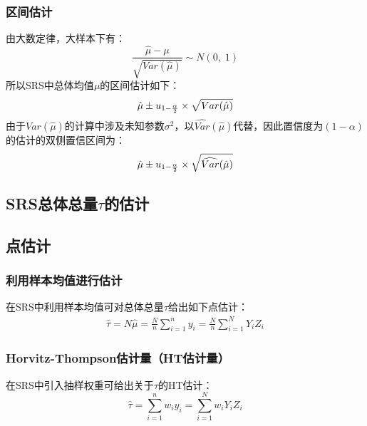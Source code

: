 \subsubsection{区间估计}
\begin{theorem}
	由大数定律，大样本下有：
	\begin{equation*}
		\frac{\hat{\mu}-\mu}{\sqrt{Var(\hat{\mu})}}\sim N(0,\;1)
	\end{equation*}
	所以SRS中总体均值$\mu$的区间估计如下：
	\begin{equation}
		\hat{\mu}\pm u_{1-\frac{\alpha}{2}}\times\sqrt{Var(\hat{\mu})}\notag
	\end{equation}
	由于$Var(\hat{\mu})$的计算中涉及未知参数$\sigma^2$，以$\widehat{Var}(\hat{\mu})$代替，因此置信度为$(1-\alpha)$的估计的双侧置信区间为\label{sec:SRSmuci}：
	\begin{equation}
		\hat{\mu}\pm u_{1-\frac{\alpha}{2}}\times\sqrt{\widehat{Var}(\hat{\mu})}\notag
	\end{equation}
\end{theorem}

\subsection{SRS总体总量$\tau$的估计}
\subsection*{点估计}
\subsubsection{利用样本均值进行估计}
\begin{definition}
	在SRS中利用样本均值可对总体总量$\tau$给出如下点估计：
	\begin{gather*}
		\hat{\tau}=N\hat{\mu}=\frac{N}{n}\sum\limits_{i=1}^{n}y_i=\frac{N}{n}\sum\limits_{i=1}^{N}Y_iZ_i
	\end{gather*}
\end{definition}
\subsubsection{Horvitz-Thompson估计量（HT估计量）}
\begin{definition}
	在SRS中引入抽样权重可给出关于$\tau$的HT估计：
	\begin{equation*}
		\hat{\tau}=\sum\limits_{i=1}^{n}w_iy_i=\sum\limits_{i=1}^Nw_iY_iZ_i
	\end{equation*}
\end{definition}
